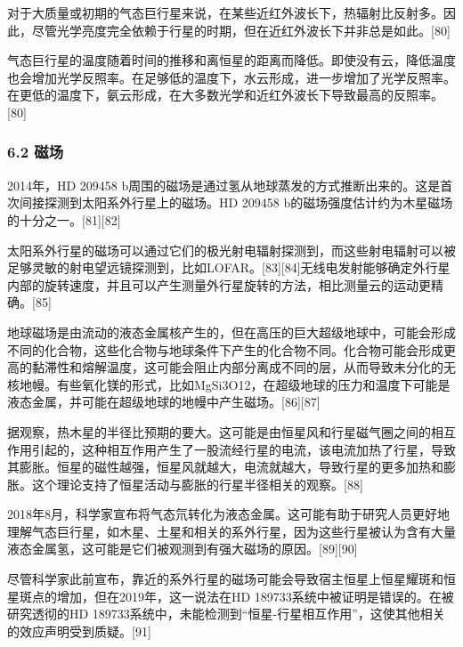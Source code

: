 对于大质量或初期的气态巨行星来说，在某些近红外波长下，热辐射比反射多。因此，尽管光学亮度完全依赖于行星的时期，但在近红外波长下并非总是如此。[80]

气态巨行星的温度随着时间的推移和离恒星的距离而降低。即使没有云，降低温度也会增加光学反照率。在足够低的温度下，水云形成，进一步增加了光学反照率。在更低的温度下，氨云形成，在大多数光学和近红外波长下导致最高的反照率。[80]
\subsubsection{6.2 磁场}
2014年，HD 209458 b周围的磁场是通过氢从地球蒸发的方式推断出来的。这是首次间接探测到太阳系外行星上的磁场。HD 209458 b的磁场强度估计约为木星磁场的十分之一。[81][82]

太阳系外行星的磁场可以通过它们的极光射电辐射探测到，而这些射电辐射可以被足够灵敏的射电望远镜探测到，比如LOFAR。[83][84]无线电发射能够确定外行星内部的旋转速度，并且可以产生测量外行星旋转的方法，相比测量云的运动更精确。[85]

地球磁场是由流动的液态金属核产生的，但在高压的巨大超级地球中，可能会形成不同的化合物，这些化合物与地球条件下产生的化合物不同。化合物可能会形成更高的黏滞性和熔解温度，这可能会阻止内部分离成不同的层，从而导致未分化的无核地幔。有些氧化镁的形式，比如MgSi3O12，在超级地球的压力和温度下可能是液态金属，并可能在超级地球的地幔中产生磁场。[86][87]

据观察，热木星的半径比预期的要大。这可能是由恒星风和行星磁气圈之间的相互作用引起的，这种相互作用产生了一股流经行星的电流，该电流加热了行星，导致其膨胀。恒星的磁性越强，恒星风就越大，电流就越大，导致行星的更多加热和膨胀。这个理论支持了恒星活动与膨胀的行星半径相关的观察。[88]

2018年8月，科学家宣布将气态氘转化为液态金属。这可能有助于研究人员更好地理解气态巨行星，如木星、土星和相关的系外行星，因为这些行星被认为含有大量液态金属氢，这可能是它们被观测到有强大磁场的原因。[89][90]

尽管科学家此前宣布，靠近的系外行星的磁场可能会导致宿主恒星上恒星耀斑和恒星斑点的增加，但在2019年，这一说法在HD 189733系统中被证明是错误的。在被研究透彻的HD 189733系统中，未能检测到“恒星-行星相互作用”，这使其他相关的效应声明受到质疑。[91]
